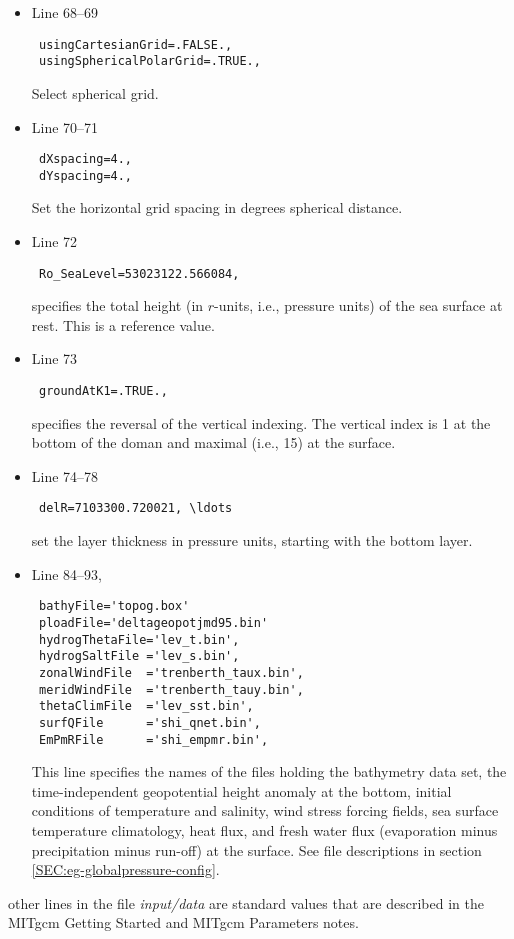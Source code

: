 {\begin{itemize}
\item Line 68--69
\begin{verbatim}
 usingCartesianGrid=.FALSE.,
 usingSphericalPolarGrid=.TRUE.,
\end{verbatim}
  Select spherical grid.
\item Line 70--71
\begin{verbatim}
 dXspacing=4.,
 dYspacing=4.,
\end{verbatim}
Set the horizontal grid spacing in degrees spherical distance.
\item Line 72
\begin{verbatim}
 Ro_SeaLevel=53023122.566084,
\end{verbatim}
specifies the total height (in $r$-units, i.e., pressure units) of the
sea surface at rest. This is a reference value.
\item Line 73
\begin{verbatim}
 groundAtK1=.TRUE.,
\end{verbatim}
specifies the reversal of the vertical indexing. The vertical index is 
1 at the bottom of the doman and maximal (i.e., 15) at the surface.
\item Line 74--78
\begin{verbatim}
 delR=7103300.720021, \ldots 
\end{verbatim}
  set the layer thickness in pressure units, starting with the bottom
  layer.

\item Line 84--93,
\begin{verbatim}
 bathyFile='topog.box'
 ploadFile='deltageopotjmd95.bin'
 hydrogThetaFile='lev_t.bin',
 hydrogSaltFile ='lev_s.bin',
 zonalWindFile  ='trenberth_taux.bin',
 meridWindFile  ='trenberth_tauy.bin',
 thetaClimFile  ='lev_sst.bin',
 surfQFile      ='shi_qnet.bin',
 EmPmRFile      ='shi_empmr.bin',
\end{verbatim}
  This line specifies the names of the files holding the bathymetry
  data set, the
  time-independent geopotential height anomaly at the bottom, initial
  conditions of temperature and salinity, wind stress forcing fields,
  sea surface temperature climatology, heat flux, and fresh water flux
  (evaporation minus precipitation minus run-off) at the surface. 
  See file descriptions in section \ref{SEC:eg-globalpressure-config}.

\end{itemize}

\noindent other lines in the file {\it input/data} are standard values
that are described in the MITgcm Getting Started and MITgcm Parameters
notes.

}

